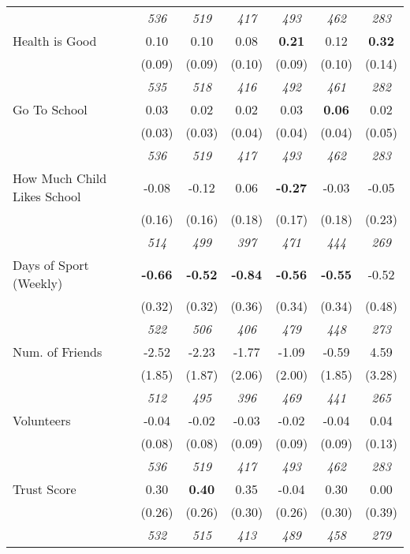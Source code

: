 \begin{tabular}{l c c c c c c}
& \textit{ 536 } & \textit{ 519 } & \textit{ 417 } & \textit{ 493 } & \textit{ 462 } & \textit{ 283 } \\
Health is Good & 0.10 & 0.10 & 0.08 & \textbf{ 0.21 } & 0.12 & \textbf{ 0.32 } \\
& (0.09) & (0.09) & (0.10) & (0.09) & (0.10) & (0.14) \\
& \textit{ 535 } & \textit{ 518 } & \textit{ 416 } & \textit{ 492 } & \textit{ 461 } & \textit{ 282 } \\
Go To School & 0.03 & 0.02 & 0.02 & 0.03 & \textbf{ 0.06 } & 0.02 \\
& (0.03) & (0.03) & (0.04) & (0.04) & (0.04) & (0.05) \\
& \textit{ 536 } & \textit{ 519 } & \textit{ 417 } & \textit{ 493 } & \textit{ 462 } & \textit{ 283 } \\
How Much Child Likes School & -0.08 & -0.12 & 0.06 & \textbf{ -0.27 } & -0.03 & -0.05 \\
& (0.16) & (0.16) & (0.18) & (0.17) & (0.18) & (0.23) \\
& \textit{ 514 } & \textit{ 499 } & \textit{ 397 } & \textit{ 471 } & \textit{ 444 } & \textit{ 269 } \\
Days of Sport (Weekly) & \textbf{ -0.66 } & \textbf{ -0.52 } & \textbf{ -0.84 } & \textbf{ -0.56 } & \textbf{ -0.55 } & -0.52 \\
& (0.32) & (0.32) & (0.36) & (0.34) & (0.34) & (0.48) \\
& \textit{ 522 } & \textit{ 506 } & \textit{ 406 } & \textit{ 479 } & \textit{ 448 } & \textit{ 273 } \\
Num. of Friends & -2.52 & -2.23 & -1.77 & -1.09 & -0.59 & 4.59 \\
& (1.85) & (1.87) & (2.06) & (2.00) & (1.85) & (3.28) \\
& \textit{ 512 } & \textit{ 495 } & \textit{ 396 } & \textit{ 469 } & \textit{ 441 } & \textit{ 265 } \\
Volunteers & -0.04 & -0.02 & -0.03 & -0.02 & -0.04 & 0.04 \\
& (0.08) & (0.08) & (0.09) & (0.09) & (0.09) & (0.13) \\
& \textit{ 536 } & \textit{ 519 } & \textit{ 417 } & \textit{ 493 } & \textit{ 462 } & \textit{ 283 } \\
Trust Score & 0.30 & \textbf{ 0.40 } & 0.35 & -0.04 & 0.30 & 0.00 \\
& (0.26) & (0.26) & (0.30) & (0.26) & (0.30) & (0.39) \\
& \textit{ 532 } & \textit{ 515 } & \textit{ 413 } & \textit{ 489 } & \textit{ 458 } & \textit{ 279 } \\
\bottomrule
\end{tabular}
